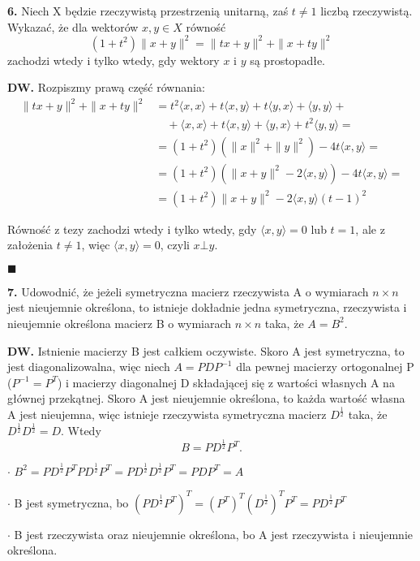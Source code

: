 \documentclass{article}
\begin{document}
\begin{center}
\large \textbf{6.} Niech X będzie rzeczywistą przestrzenią unitarną, zaś $t\neq1$ liczbą rzeczywistą. Wykazać, że dla wektorów $x,y\in X$ równość
$$(1+t^2)\|x+y\|^2=\|tx+y\|^2+\|x+ty\|^2$$
zachodzi wtedy i tylko wtedy, gdy wektory $x$ i $y$ są prostopadłe.
\end{center}
\textbf{DW.} Rozpiszmy prawą część równania:
\begin{align*}
\|tx+y\|^2+\|x+ty\|^2&=t^2\langle x,x\rangle+t\langle x,y\rangle+t\langle y,x\rangle+\langle y,y\rangle+\\
&\quad+\langle x,x\rangle+t\langle x,y\rangle+\langle y,x\rangle+t^2\langle y,y\rangle=\\
&= (1+t^2)(\|x\|^2+\|y\|^2) -4t\langle x,y\rangle=\\
&=(1+t^2)(\|x+y\|^2-2\langle x,y\rangle) -4t\langle x,y\rangle=\\
&=(1+t^2)\|x+y\|^2-2\langle x,y\rangle(t-1)^2
\end{align*}

Równość z tezy zachodzi wtedy i tylko wtedy, gdy $\langle x,y\rangle=0$ lub $t=1$, ale z założenia $t\neq1$, więc $\langle x,y\rangle=0$, czyli $x\bot y$.
\begin{flushright}
$\blacksquare$
\end{flushright}

\begin{center}
\large\textbf{7.} Udowodnić, że jeżeli symetryczna macierz rzeczywista A o wymiarach $n\times n$ jest nieujemnie
określona, to istnieje dokładnie jedna symetryczna, rzeczywista i nieujemnie określona macierz
B o wymiarach $n\times n$ taka, że $A=B^2$.
\end{center}
\normalsize
\textbf{DW.} Istnienie macierzy B jest całkiem oczywiste. Skoro A jest symetryczna, to jest diagonalizowalna, więc niech $A=PDP^{-1}$ dla pewnej macierzy ortogonalnej P ($P^{-1}=P^T$) i macierzy diagonalnej D składającej się z wartości własnych A na głównej przekątnej. Skoro A jest nieujemnie określona, to każda wartość własna A jest nieujemna, więc istnieje rzeczywista symetryczna macierz $D^{\frac{1}{2}}$ taka, że $D^{\frac{1}{2}}D^{\frac{1}{2}}=D$. Wtedy $$B=PD^{\frac{1}{2}}P^T.$$ 

$\cdot$ $B^2=PD^{\frac{1}{2}}P^TPD^{\frac{1}{2}}P^T=PD^{\frac{1}{2}}D^{\frac{1}{2}}P^T=PDP^T=A$

$\cdot$ B jest symetryczna, bo $(PD^{\frac{1}{2}}P^T)^T=(P^T)^T(D^{\frac{1}{2}})^TP^T=PD^{\frac{1}{2}}P^T$

$\cdot$ B jest rzeczywista oraz nieujemnie określona, bo A jest rzeczywista i nieujemnie określona.
\end{document}
